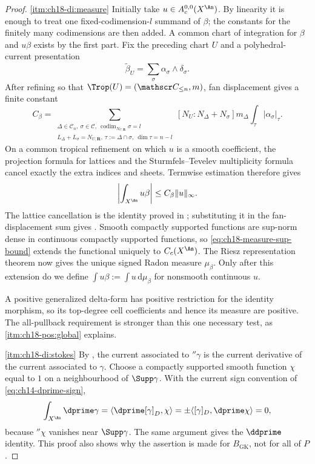 \begin{proof}
\cref{itm:ch18-di:measure} Initially take $u\in A_c^{0,0}(X^{\An})$.
By linearity it is enough to treat one fixed-codimension-$l$ summand of
$\beta$; the constants for the finitely many codimensions are then added.
A common chart of integration for $\beta$ and $u\beta$ exists by the first
part.  Fix the preceding chart $U$ and a polyhedral-current presentation
\[
                    \widetilde\beta_U=\sum_\sigma
                       \alpha_\sigma\wedge\delta_\sigma .
\]
After refining so that $\Trop(U)=(\mathscr C_{\leq n},m)$, fan displacement
gives a finite constant
\[
 C_\beta=
 \sum_{\substack{\Delta\in\mathscr C_n,\ \sigma\in\mathscr C,\
                  \operatorname{codim}_{N_{U,\mathbf R}}\sigma=l\\
                  L_\Delta+L_\sigma=N_{U,\mathbf R},\
                  \tau:=\Delta\cap\sigma,\ \dim\tau=n-l}}
 [N_U:N_\Delta+N_\sigma]m_\Delta
 \int_\tau|\alpha_\sigma|_\tau.
\]
On a common tropical refinement on which $u$ is a smooth coefficient, the
projection formula for lattices and the Sturmfels--Tevelev multiplicity
formula cancel exactly the extra indices and sheets.  Termwise estimation
therefore gives
\begin{equation}
\label{eq:ch18-measure-sup-bound}
               \left|\int_{X^{\An}}u\beta\right|
                    \leq C_\beta\|u\|_\infty .
\end{equation}
The lattice cancellation is the identity proved in
\cite[Lemma~6.14]{GK17}; substituting it in the fan-displacement sum gives
\cite[Proposition~6.13]{GK17}.  Smooth compactly supported functions are
sup-norm dense in continuous compactly supported functions, so
\eqref{eq:ch18-measure-sup-bound} extends the functional uniquely to
$C_c(X^{\An})$.  The Riesz representation theorem now gives the unique
signed Radon measure $\mu_\beta$.  Only after this extension do we define
$\int u\beta:=\int u\,\mathrm d\mu_\beta$ for nonsmooth continuous $u$.

A positive generalized
delta-form has positive restriction for the identity morphism, so its
top-degree cell coefficients and hence its measure are positive.  The
all-pullback requirement is stronger than this one necessary test, as
\Cref{lem:ch18-positivity-consistent}\,\cref{itm:ch18-pos:global} explains.

\cref{itm:ch18-di:stokes} By
, the current associated to
$\dprime\gamma$ is the current derivative of the current associated to
$\gamma$.  Choose a compactly supported smooth function $\chi$ equal to $1$
on a neighbourhood of $\Supp\gamma$.  With the current sign convention of
\eqref{eq:ch14-dprime-sign},
\[
 \int_{X^{\An}}\dprime\gamma
 =\langle\dprime[\gamma]_D,\chi\rangle
 =\pm\langle[\gamma]_D,\dprime\chi\rangle=0,
\]
because $\dprime\chi$ vanishes near $\Supp\gamma$.  The same argument gives
the $\ddprime$ identity.  This proof also shows why the assertion is made
for $B_{\mathrm{GK}}$, not for all of $P$.
\end{proof}

